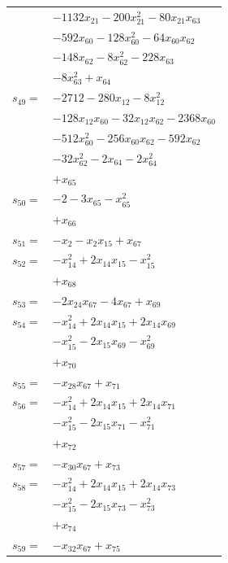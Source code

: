 \begin{longtable}{@{}r@{\;}l@{}}
 & \(\displaystyle -1132x_{21} -200x_{21}^{2} -80x_{21}x_{63}\) \\
 & \(\displaystyle -592x_{60} -128x_{60}^{2} -64x_{60}x_{62}\) \\
 & \(\displaystyle -148x_{62} -8x_{62}^{2} -228x_{63}\) \\
 & \(\displaystyle -8x_{63}^{2} +x_{64}\) \\[3pt]
\(s_{49}=\) & \(\displaystyle -2712 -280x_{12} -8x_{12}^{2}\) \\
 & \(\displaystyle -128x_{12}x_{60} -32x_{12}x_{62} -2368x_{60}\) \\
 & \(\displaystyle -512x_{60}^{2} -256x_{60}x_{62} -592x_{62}\) \\
 & \(\displaystyle -32x_{62}^{2} -2x_{64} -2x_{64}^{2}\) \\
 & \(\displaystyle +x_{65}\) \\[3pt]
\(s_{50}=\) & \(\displaystyle -2 -3x_{65} -x_{65}^{2}\) \\
 & \(\displaystyle +x_{66}\) \\[3pt]
\(s_{51}=\) & \(\displaystyle -x_{2} -x_{2}x_{15} +x_{67}\) \\[3pt]
\(s_{52}=\) & \(\displaystyle -x_{14}^{2} +2x_{14}x_{15} -x_{15}^{2}\) \\
 & \(\displaystyle +x_{68}\) \\[3pt]
\(s_{53}=\) & \(\displaystyle -2x_{24}x_{67} -4x_{67} +x_{69}\) \\[3pt]
\(s_{54}=\) & \(\displaystyle -x_{14}^{2} +2x_{14}x_{15} +2x_{14}x_{69}\) \\
 & \(\displaystyle -x_{15}^{2} -2x_{15}x_{69} -x_{69}^{2}\) \\
 & \(\displaystyle +x_{70}\) \\[3pt]
\(s_{55}=\) & \(\displaystyle -x_{28}x_{67} +x_{71}\) \\[3pt]
\(s_{56}=\) & \(\displaystyle -x_{14}^{2} +2x_{14}x_{15} +2x_{14}x_{71}\) \\
 & \(\displaystyle -x_{15}^{2} -2x_{15}x_{71} -x_{71}^{2}\) \\
 & \(\displaystyle +x_{72}\) \\[3pt]
\(s_{57}=\) & \(\displaystyle -x_{30}x_{67} +x_{73}\) \\[3pt]
\(s_{58}=\) & \(\displaystyle -x_{14}^{2} +2x_{14}x_{15} +2x_{14}x_{73}\) \\
 & \(\displaystyle -x_{15}^{2} -2x_{15}x_{73} -x_{73}^{2}\) \\
 & \(\displaystyle +x_{74}\) \\[3pt]
\(s_{59}=\) & \(\displaystyle -x_{32}x_{67} +x_{75}\) \\[3pt]

\end{longtable}
